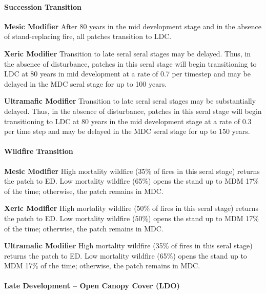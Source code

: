 \paragraph{Succession Transition}
\begin{adjustwidth}{2cm}{}
\noindent \textbf{Mesic Modifier } After 80 years in the mid development stage and in the absence of stand-replacing fire, all patches transition to LDC.

\medskip
\noindent \textbf{Xeric Modifier}  Transition to late seral seral stages may be delayed. Thus, in the absence of disturbance, patches in this seral stage will begin transitioning to LDC at 80 years in mid development at a rate of 0.7 per timestep and may be delayed in the MDC seral stage for up to 100 years.

\medskip
\noindent \textbf{Ultramafic Modifier} Transition to late seral seral stages may be substantially delayed. Thus, in the absence of disturbance, patches in this seral stage will begin transitioning to LDC at 80 years in the mid development stage at a rate of 0.3 per time step and may be delayed in the MDC seral stage for up to 150 years.

\end{adjustwidth}

\paragraph{Wildfire Transition}
\begin{adjustwidth}{2cm}{}
\noindent \textbf{Mesic Modifier } High mortality wildfire (35\% of fires in this seral stage) returns the patch to ED. Low mortality wildfire (65\%) opens the stand up to MDM 17\% of the time; otherwise, the patch remains in MDC. 

\medskip
\noindent \textbf{Xeric Modifier} High mortality wildfire (50\% of fires in this seral stage) returns the patch to ED. Low mortality wildfire (50\%) opens the stand up to MDM 17\% of the time; otherwise, the patch remains in MDC.

\medskip
\noindent \textbf{Ultramafic Modifier} High mortality wildfire (35\% of fires in this seral stage) returns the patch to ED. Low mortality wildfire (65\%) opens the stand up to MDM 17\% of the time; otherwise, the patch remains in MDC.

\end{adjustwidth}

\noindent\hrulefill


\paragraph{Late Development – Open Canopy Cover (LDO)}

